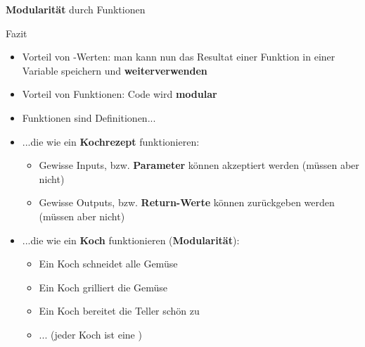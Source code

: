 \begin{frame}[fragile]{\textbf{Modularität} durch Funktionen}
\end{frame}

\begin{frame}{Fazit}
\begin{itemize}[<+->]
	\item {} Vorteil von -Werten: man kann nun das Resultat einer Funktion in einer Variable speichern und \textbf{weiterverwenden}
	\item {} Vorteil von Funktionen: Code wird \textbf{modular}
	\item Funktionen sind Definitionen...
	\item {} ...die wie ein \textbf{Kochrezept} funktionieren:
	\begin{itemize}
		\item Gewisse Inputs, bzw. \textbf{Parameter} können akzeptiert werden (müssen aber nicht)
		\item Gewisse Outputs, bzw. \textbf{Return-Werte }können zurückgeben werden (müssen aber nicht)
	\end{itemize}
	\item {} ...die wie ein \textbf{Koch} funktionieren (\textbf{Modularität}):
	\begin{itemize}
		\item Ein Koch schneidet alle Gemüse
		\item Ein Koch grilliert die Gemüse
		\item Ein Koch bereitet die Teller schön zu
		\item ... (jeder Koch ist eine )
	\end{itemize}
\end{itemize}
\end{frame}

